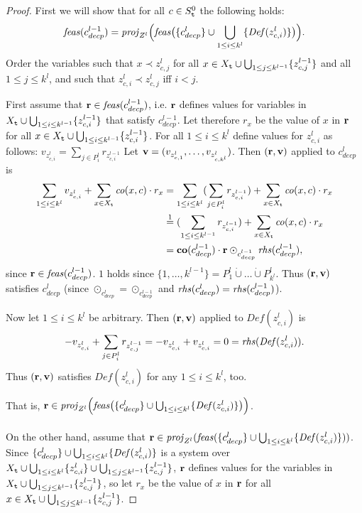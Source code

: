 \lmmmm*
\begin{proof}
First we will show that for all $c\in S_{\texttt{t}}^0$ the following holds:
\begin{equation}\label{eq:step}
\mathit{feas}(c^{l-1}_{decp}) = \mathit{proj}_{Z^l}\Big(\mathit{feas}\big(\{c^l_{decp}\}\cup\bigcup_{1\leq i\leq k^l}\{\mathit{Def}(z^l_{c,i})\}\big)\Big).
\end{equation}
Order the variables such that $x\prec z^{l}_{c,j}$ for all $x\in X_{\texttt{t}} \cup\bigcup_{1\leq j\leq k^{l-1}}\{z^{l-1}_{c,j}\}$ and all $1\leq j\leq k^l$, and such that $z^{l}_{c,i}\prec z^{l}_{c,j}$ iff $i<j$. 

First assume that  $\mathbf{r}\in\mathit{feas}(c^{l-1}_{decp})$, i.e. $\mathbf{r}$ defines values for variables in $X_{\texttt{t}}\cup \bigcup_{1\leq i\leq k^{l-1}}\{z^{l-1}_{c,i}\}$ that satisfy $c^{l-1}_{decp}$. Let therefore $r_x$ be the value of $x$ in $\mathbf{r}$ for all $x\in X_{\texttt{t}}\cup \bigcup_{1\leq i\leq k^{l-1}}\{z^{l-1}_{c,i}\}$.
For all $1\leq i\leq k^l$ define values for $z^l_{c,i}$ as follows: 
$v_{z^l_{c,i}} = \sum_{j\in P^l_i}r_{z^{l-1}_{c,i}}$ %
Let $\mathbf{v} = (v_{z^l_{c,1}}, \ldots, v_{z^l_{c,k^l}})$.
Then $(\mathbf{r},\mathbf{v})$ applied to $c^l_{decp}$ is
\begin{align*}
\sum_{1\leq i \leq k^l}v_{z^l_{c,i}} + \sum_{x\in X_{\texttt{t}}}\mathit{co}(x,c)\cdot r_x
& = \sum_{1\leq i \leq k^l}(\sum_{j\in P^l_i}r_{z^{l-1}_{c,i}}) + \sum_{x\in X_{\texttt{t}}}\mathit{co}(x,c)\cdot r_x\\
&\overset{1}= (\sum_{1\leq i \leq k^{l-1}}r_{z^{l-1}_{c,i}}) + \sum_{x\in X_{\texttt{t}}}\mathit{co}(x,c)\cdot r_x\\
&=\mathbf{co}(c^{l-1}_{decp})\cdot\mathbf{r} \odot_{c^{l-1}_{decp}} \mathit{rhs}(c^{l-1}_{decp}),
\end{align*}
since $\mathbf{r}\in \mathit{feas}(c^{l-1}_{decp})$. $1$ holds since $\{1,\ldots,k^{l-1}\} = P^l_1\dot\cup\ldots\dot\cup P^l_{k^l}$. Thus $(\mathbf{r},\mathbf{v})$ satisfies $c^l_{decp}$ (since $\odot_{c^l_{decp}}=\odot_{c^{l-1}_{decp}}$ and $\mathit{rhs}(c^l_{decp})=\mathit{rhs}(c^{l-1}_{decp})$).

Now let $1\leq i\leq k^l$ be arbitrary. Then $(\mathbf{r},\mathbf{v})$ applied to $\mathit{Def}(z^l_{c,i})$ is
\[
-v_{z^l_{c,i}}+\sum_{j\in P^l_i}r_{z^{l-1}_{c,j}} = -v_{z^l_{c,i}} + v_{z^l_{c,i}} = 0 = \mathit{rhs}(\mathit{Def}(z^l_{c,i})).
\]
Thus $(\mathbf{r},\mathbf{v})$ satisfies $\mathit{Def}(z^l_{c,i})$ for any $1\leq i\leq k^l$, too.

That is, $\mathbf{r}\in\mathit{proj}_{Z^l}\Big(\mathit{feas}\big(\{c^l_{decp}\}\cup\bigcup_{1\leq i\leq k^l}\{\mathit{Def}(z^l_{c,i})\}\big)\Big)$.
\\\\
On the other hand, assume that 
$\mathbf{r}\in \mathit{proj}_{Z^l}(\mathit{feas}(\{c^l_{decp}\}\cup\bigcup_{1\leq i\leq k^l}\{\mathit{Def}(z^l_{c,i})\}))$. Since $\{c^l_{decp}\}\cup\bigcup_{1\leq i\leq k^l}\{\mathit{Def}(z^l_{c,i})\}$ is a system over $X_{\texttt{t}}\cup \bigcup_{1\leq i\leq k^l}\{z^l_{c,i}\}\cup\bigcup_{1\leq j\leq k^{l-1}}\{z^{l-1}_{c,j}\}$, $\mathbf{r}$ defines values for the variables in $X_{\texttt{t}}\cup\bigcup_{1\leq j\leq k^{l-1}}\{z^{l-1}_{c,j}\}$, so let 
$r_x$ be the value of $x$ in $\mathbf{r}$ for all $x\in X_{\texttt{t}}\cup\bigcup_{1\leq j\leq k^{l-1}}\{z^{l-1}_{c,j}\}$.


\end{proof}
